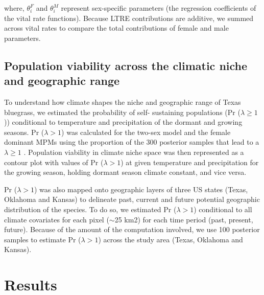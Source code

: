 \documentclass[12pt]{article}\usepackage[]{graphicx}\usepackage[dvipsnames]{xcolor}
\newcommand{\tom}[2]{{\color{red}{#1}}\footnote{\textit{\color{red}{#2}}}}
\begin{document}
\noindent where, $\theta^{F}_{i}$ and $\theta^{M}_{i}$ represent sex-specific parameters (the regression coefficients of the vital rate functions). 
Because LTRE contributions are additive, we summed across vital rates to compare the total contributions of female and male parameters.

\subsection*{Population viability across the climatic niche and geographic range}
To understand how climate shapes the niche and geographic range of Texas bluegrass, we estimated the probability of self- sustaining populations (Pr ($\lambda \ge 1$)) conditional to temperature and precipitation of the dormant and growing seasons.
Pr ($\lambda > 1$) was calculated for the two-sex model and the female dominant MPMs using the proportion of the 300 posterior samples that lead to a $\lambda \ge 1$ \citep{diez2014probabilistic}.
Population viability in climate niche space was then represented as a contour plot with values of Pr ($\lambda > 1$) at given temperature and precipitation for the growing season, holding dormant season climate constant, and vice versa. 

Pr ($\lambda > 1$) was also mapped onto geographic layers of three US states (Texas, Oklahoma and Kansas) to delineate past, current and future potential geographic distribution of the species.
To do so, we estimated Pr ($\lambda > 1$) conditional to all climate covariates for each pixel ($\sim$25 km2) for each time period (past, present, future).
Because of the amount of the computation involved, we use 100 posterior samples to estimate Pr ($\lambda > 1$) across the study area (Texas, Oklahoma and Kansas).


\section*{Results}
\end{document}

